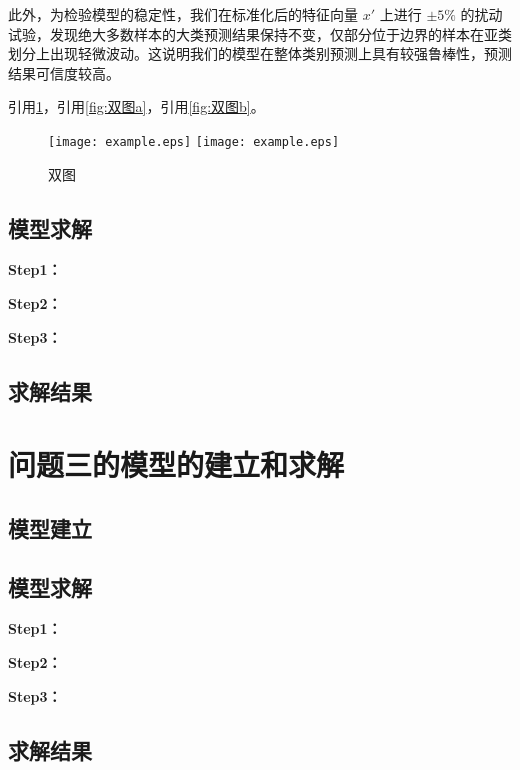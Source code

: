 \documentclass[withoutpreface,bwprint]{cumcmthesis}
\begin{document}
此外，为检验模型的稳定性，我们在标准化后的特征向量 $x'$ 上进行 $\pm 5\%$ 的扰动试验，发现绝大多数样本的大类预测结果保持不变，仅部分位于边界的样本在亚类划分上出现轻微波动。这说明我们的模型在整体类别预测上具有较强鲁棒性，预测结果可信度较高。


引用\cref{fig:双图}，引用\cref{fig:双图a}，引用\cref{fig:双图b}。

\begin{figure}[ht]
\centering
{}
{\texttt{[image: example.eps]}}
{\texttt{[image: example.eps]}}
\caption{双图}\label{fig:双图}
\end{figure} 

\subsection{模型求解}

\textbf{Step1：} 

\textbf{Step2：} 

\textbf{Step3：} 

\subsection{求解结果}


\section{问题三的模型的建立和求解}
\subsection{模型建立}

\subsection{模型求解}

\textbf{Step1：} 

\textbf{Step2：} 

\textbf{Step3：} 

\subsection{求解结果}
\end{document}
